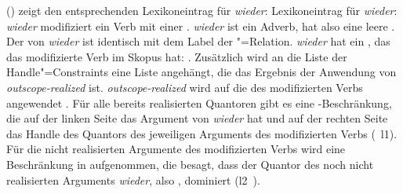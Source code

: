 () zeigt den entsprechenden Lexikoneintrag für \emph{wieder}:
\eas
\label{le-wieder}%
Lexikoneintrag für \emph{wieder}:\\
\zs
\emph{wieder} modifiziert ein Verb mit einer \compsl {}. \emph{wieder} ist ein Adverb, hat
also eine leere \argstl. Der \ltopw von \emph{wieder} ist identisch mit dem
Label der "=Relation. \emph{wieder} hat ein \argone, das das modifizierte Verb im
Skopus hat:  \qeq {}. Zusätzlich wird an die Liste der Handle"=Constraints eine Liste
angehängt, die das Ergebnis der Anwendung von \emph{outscope-realized} ist. \emph{outscope-realized} wird auf die
\compsl des modifizierten Verbs angewendet . Für alle bereits realisierten Quantoren gibt
es eine \qeq-Beschränkung, die auf der linken Seite das Argument von \emph{wieder}  hat
und auf der rechten Seite das Handle des Quantors des jeweiligen Arguments des modifizierten Verbs (\, \qeq l1). Für
die nicht realisierten Argumente des modifizierten Verbs wird eine Beschränkung in \hcons
aufgenommen, die besagt, dass der Quantor des noch nicht realisierten Arguments \emph{wieder}, also
, dominiert (l2 \qeq {}\,).
